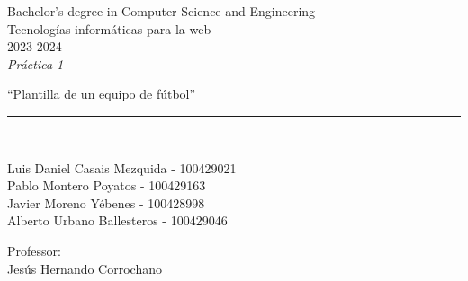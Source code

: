 \def\degree{Bachelor's degree in Computer Science and Engineering}
\def\subject{Tecnologías informáticas para la web}
\def\year{2023-2024}
\def\labType{Práctica 1}
\def\labName{Plantilla de un equipo de fútbol}
\def\proffesor{Jesús Hernando Corrochano}

\begin{titlepage}
	\begin{sffamily}
	\color{azulUC3M}
	\begin{center}

		\begin{figure}[H]
		\end{figure}
		\vspace{1.5cm}

		\begin{Large}
			\degree\\
            \subject\\
			\year\\
			\vspace{2cm}		
			\textsl{\labType}
			\bigskip
			
		\end{Large}

		{\Huge ``\labName''}\\

		\vspace*{0.5cm}
		\rule{10.5cm}{0.1mm}\\
		\vspace*{0.9cm}
		
 		{\LARGE Luis Daniel Casais Mezquida - 100429021}\\
 		\vspace*{0.2cm}
 		{\LARGE Pablo Montero Poyatos - 100429163}\\
 		\vspace*{0.2cm}
 		{\LARGE Javier Moreno Yébenes - 100428998}\\
 		\vspace*{0.2cm}
 		{\LARGE Alberto Urbano Ballesteros - 100429046}\\
 		\vspace*{0.2cm}
		
		\vspace*{0.8cm}
		
		\begin{Large}
		    Professor:\\
			\proffesor\\
		\end{Large}

	\end{center}
	\vfill
	\end{sffamily}
\end{titlepage}